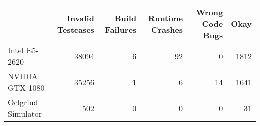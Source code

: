 \begin{tabular}{lrrrrr}
\toprule
{} &  Invalid Testcases &  Build Failures &  Runtime Crashes &  Wrong Code Bugs &  Okay \\
\midrule
Intel E5-2620      &              38094 &               6 &               92 &                0 &  1812 \\
NVIDIA GTX 1080    &              35256 &               1 &                6 &               14 &  1641 \\
Oclgrind Simulator &                502 &               0 &                0 &                0 &    31 \\
\bottomrule
\end{tabular}
